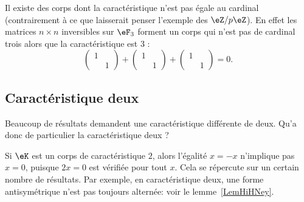 \begin{example}
	Il existe des corps dont la caractéristique n'est pas égale au cardinal (contrairement à ce que laisserait penser l'exemple des \( \eZ/p\eZ\)). En effet les matrices \( n\times n\) inversibles sur \( \eF_{3}\) forment un corps qui n'est pas de cardinal trois alors que la caractéristique est \( 3\) :
	\begin{equation}
		\begin{pmatrix}
			1 &   \\
			  & 1
		\end{pmatrix}+\begin{pmatrix}
			1 &   \\
			  & 1
		\end{pmatrix}+\begin{pmatrix}
			1 &   \\
			  & 1
		\end{pmatrix}=0.
	\end{equation}
\end{example}


\subsection{Caractéristique deux}

Beaucoup de résultats demandent une caractéristique différente de deux. Qu'a donc de particulier la caractéristique deux ?

Si \( \eK\) est un corps de caractéristique \( 2\), alors l'égalité \( x=-x\) n'implique pas \( x=0\), puisque \( 2x=0\) est vérifiée pour tout \( x\). Cela se répercute sur un certain nombre de résultats. Par exemple, en caractéristique deux, une forme antisymétrique n'est pas toujours alternée: voir le lemme~\ref{LemHiHNey}.

